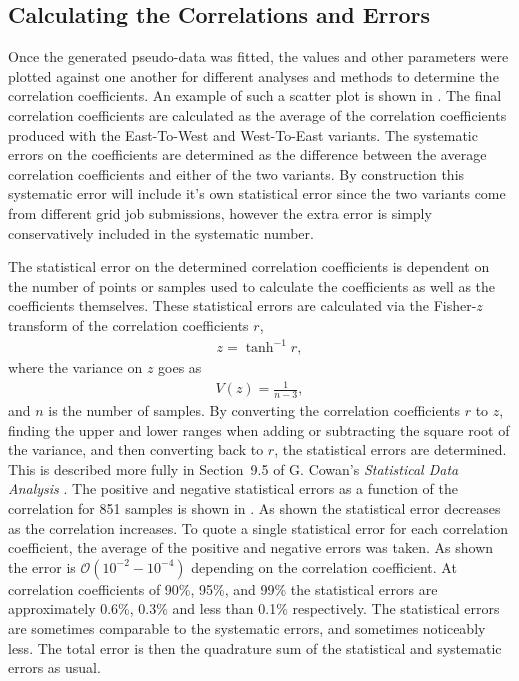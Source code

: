 \clearpage
\subsection{Calculating the Correlations and Errors}


Once the generated pseudo-data was fitted, the \R values and other parameters were plotted against one another for different analyses and methods to determine the correlation coefficients. An example of such a scatter plot is shown in . The final correlation coefficients are calculated as the average of the correlation coefficients produced with the East-To-West and West-To-East variants. The systematic errors on the coefficients are determined as the difference between the average correlation coefficients and either of the two variants. By construction this systematic error will include it's own statistical error since the two variants come from different grid job submissions, however the extra error is simply conservatively included in the systematic number.


The statistical error on the determined correlation coefficients is dependent on the number of points or samples used to calculate the coefficients as well as the coefficients themselves. These statistical errors are calculated via the Fisher-$z$ transform of the correlation coefficients $r$,
\begin{align}
    z = \tanh^{-1}r,
\end{align}
where the variance on $z$ goes as
\begin{align}
    V(z) = \frac{1}{n-3},
\end{align}
and $n$ is the number of samples. By converting the correlation coefficients $r$ to $z$, finding the upper and lower ranges when adding or subtracting the square root of the variance, and then converting back to $r$, the statistical errors are determined. This is described more fully in Section~9.5 of G. Cowan's \textit{Statistical Data Analysis} \cite{Cowan}. The positive and negative statistical errors as a function of the correlation for 851 samples is shown in . As shown the statistical error decreases as the correlation increases. To quote a single statistical error for each correlation coefficient, the average of the positive and negative errors was taken. As shown the error is $\mathcal{O}(10^{-2} - 10^{-4})$ depending on the correlation coefficient. At correlation coefficients of 90\%, 95\%, and 99\% the statistical errors are approximately 0.6\%, 0.3\% and less than 0.1\% respectively. The statistical errors are sometimes comparable to the systematic errors, and sometimes noticeably less. The total error is then the quadrature sum of the statistical and systematic errors as usual.


